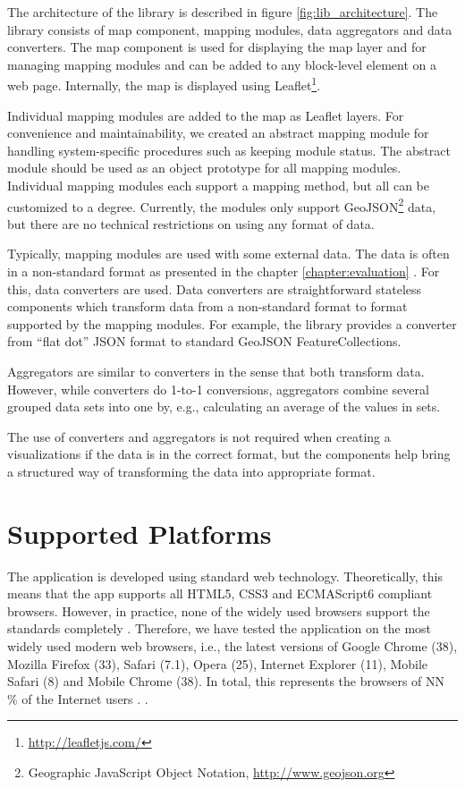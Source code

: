 The architecture of the library is described in figure \ref{fig:lib_architecture}. The library consists of map component, mapping modules, data aggregators and data converters. The map component is used for displaying the map layer and for managing mapping modules and can be added to any block-level element on a web page. Internally, the map is displayed using Leaflet\footnote{\url{http://leafletjs.com/}}. 

Individual mapping modules are added to the map as Leaflet layers. For convenience and maintainability, we created an abstract mapping module for handling system-specific procedures such as keeping module status. The abstract module should be used as an object prototype for all mapping modules. Individual mapping modules each support a mapping method, but all can be customized to a degree. Currently, the modules only support GeoJSON\footnote{Geographic JavaScript Object Notation, \url{http://www.geojson.org}} data, but there are no technical restrictions on using any format of data.

Typically, mapping modules are used with some external data. The data is often in a non-standard format as presented in the chapter \ref{chapter:evaluation} . For this, data converters are used. Data converters are straightforward stateless components which transform data from a non-standard format to format supported by the mapping modules. For example, the library provides a converter from ``flat dot'' JSON format  to standard GeoJSON FeatureCollections.

Aggregators are similar to converters in the sense that both transform data. However, while converters do 1-to-1 conversions, aggregators combine several grouped data sets into one by, e.g., calculating an average of the values in sets.
	
The use of converters and aggregators is not required when creating a visualizations if the data is in the correct format, but the components help bring a structured way of transforming the data into appropriate format.

\section{Supported Platforms}

The application is developed using standard web technology. Theoretically, this means that the app supports all HTML5, CSS3 and ECMAScript6 compliant browsers. However, in practice, none of the widely used browsers support the standards completely \citep{manian_html5_2011}. Therefore, we have tested the application on the most widely used modern web browsers, i.e., the latest versions of Google Chrome (38), Mozilla Firefox (33), Safari (7.1), Opera (25), Internet Explorer (11), Mobile Safari (8) and Mobile Chrome (38). In total, this represents the browsers of NN \% of the Internet users \citep{statcounter_globalstats_2014}. .

